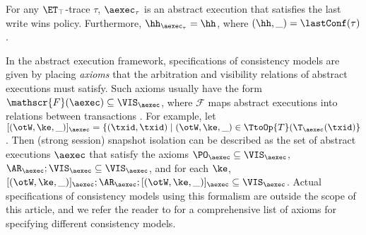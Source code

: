 \begin{proposition}
\label{prop:kvtrace2aexec}
For any $\ET_{\top}$-trace $\tau$, $\aexec_{\tau}$ is an abstract execution that 
satisfies the last write wins policy. Furthermore, $\hh_{\aexec_{\tau}} = \hh$, where 
$(\hh, \_) = \lastConf(\tau)$.
\end{proposition}

In the abstract execution framework, specifications of consistency models are given by placing \emph{axioms} that the 
arbitration and visibility relations of abstract executions must satisfy. Such axioms usually 
have the form $\mathscr{F}(\aexec) \subseteq \VIS_{\aexec}$, 
where $\mathscr{F}$ maps abstract executions into relations between transactions \cite{laws}. 
For example, let $[(\otW, \ke, \_)]_{\aexec} = \{(\txid, \txid) \mid (\otW, \ke, \_) \in \TtoOp{T}(\T_{\aexec}(\txid) \}$. 
Then (strong session) snapshot isolation can be described as the set of abstract executions $\aexec$ that 
satisfy the axioms $\PO_{\aexec} \subseteq \VIS_{\aexec}$, $\AR_{\aexec} ; \VIS_{\aexec} \subseteq \VIS_{\aexec}$, 
and for each $\ke$, $[(\otW, \ke, \_)]_{\aexec} ; \AR_{\aexec} ; [(\otW, \ke, \_)]_{\aexec} \subseteq \VIS_{\aexec}$. 
Actual specifications of consistency models using this formalism are outside the scope of this article, and we 
refer the reader to \cite{laws} for a comprehensive list of axioms for specifying different consistency models.

